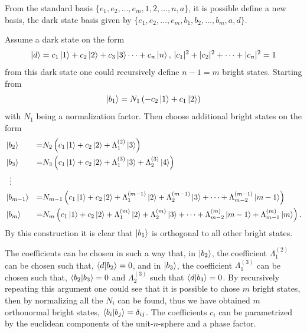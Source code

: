 From the standard basis $\{e_1,e_2,\dots,e_m,1,2,\dots,n,a\}$, it is possible define a new basis, the dark state basis given by $\{e_1,e_2,\dots,e_m,b_1,b_2,\dots,b_{m},a,d\}$.

Assume a dark state on the form 
\begin{equation}
\ket{d} = c_1\ket{1} + c_2\ket{2} + c_3\ket{3} \dots + c_{n}\ket{n},\, |c_1|^2 + |c_2|^2 + \dots + |c_{n}|^2 = 1
\end{equation}
from this dark state one could recursively define $n-1 = m$ bright states.
Starting from
\begin{equation}
\ket{b_1} = N_1\left(-c_2\ket{1} + c_1\ket{2}\right)
\end{equation}
with $N_1$ being a normalization factor. Then choose additional bright states on the form
\begin{equation}
\begin{aligned}
&\ket{b_2} &=& N_2 \left(c_1\ket{1} + c_2\ket{2} + \Lambda_{1}^{(2)}\ket{3}  \right)
\\
&\ket{b_3} &=&  N_3 \left(c_1\ket{1} + c_2\ket{2} + \Lambda_{1}^{(3)}\ket{3} + \Lambda_{2}^{(3)}\ket{4} \right)
\\
&\;\;\vdots
\\
&\ket{b_{m-1}} &=& N_{m-1} \left( c_1\ket{1} + c_2\ket{2} + \Lambda_{1}^{(m-1)}\ket{2} + \Lambda_{2}^{(m-1)}\ket{3} + \dots + \Lambda_{m-2}^{(m-1)}\ket{m-1} \right)
\\
&\ket{b_{m}} &=& N_m \left( c_1\ket{1} + c_2\ket{2} + \Lambda_{1}^{(m)}\ket{2} + \Lambda_{2}^{(m)}\ket{3} + \dots + \Lambda_{m-2}^{(m)}\ket{m-1} + \Lambda_{m-1}^{(m)}\ket{m} \right).
\end{aligned}
\end{equation}
By this construction it is clear that $\ket{b_1}$ is orthogonal to all other bright states.

The coefficients can be chosen in such a way that, in $\ket{b_2}$, the coefficient $\Lambda_1^{(2)}$ can be chosen such that, $\bra{d}\ket{b_2} = 0$, and in $\ket{b_3}$, the coefficient $\Lambda_1^{(3)}$ can be chosen such that, $\bra{b_2}\ket{b_3} = 0$ and $\Lambda_2^{(3)}$ such that $\bra{d}\ket{b_3} = 0$. By recursively repeating this argument one could see that it is possible to chose $m$ bright states, then by normalizing all the $N_i$ can be found, thus we have obtained $m$ orthonormal bright states, $\bra{b_i}\ket{b_j} = \delta_{ij}$.
The coefficients $c_i$ can be parametrized by the euclidean components of the unit-$n$-sphere and a phase factor.

